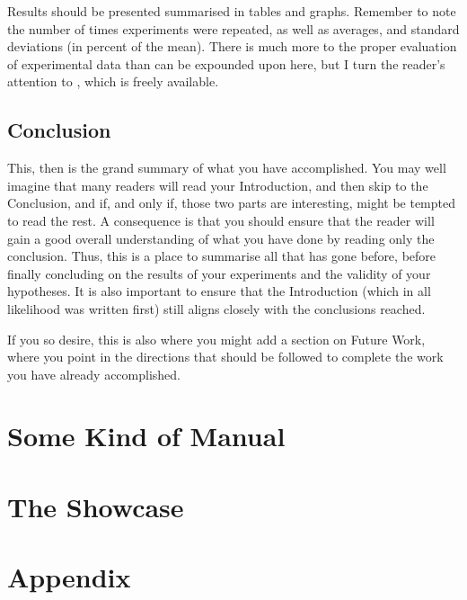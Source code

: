 \documentclass[ twoside,openright,titlepage,numbers=noenddot,headinclude,%
                footinclude=true,cleardoublepage=empty,abstractoff, %
                BCOR=5mm,paper=a4,fontsize=11pt,%
                ngerman,american,%
                ]{scrreprt}
\begin{document}
Results should be presented summarised in tables and graphs.  Remember
to note the number of times experiments were repeated, as well as
averages, and standard deviations (in percent of the mean).  There is
much more to the proper evaluation of experimental data than can be
expounded upon here, but I turn the reader's attention to
\citep{Downey2011:TSPASFP2011}, which is freely available.


\chapter{Conclusion}
\label{cha:conclusion}

This, then is the grand summary of what you have accomplished.  You
may well imagine that many readers will read your Introduction, and
then skip to the Conclusion, and if, and only if, those two parts are
interesting, might be tempted to read the rest. A consequence is that
you should ensure that the reader will gain a good overall
understanding of what you have done by reading only the conclusion.
Thus, this is a place to summarise all that has gone before, before
finally concluding on the results of your experiments and the validity
of your hypotheses. It is also important to ensure that the
Introduction (which in all likelihood was written first) still aligns
closely with the conclusions reached.

If you so desire, this is also where you might add a section on Future
Work, where you point in the directions that should be followed to
complete the work you have already accomplished.



\part{Some Kind of Manual}

\cleardoublepage

\part{The Showcase}





\appendix
\cleardoublepage
\part{Appendix}

\cleardoublepage
\cleardoublepage
\cleardoublepage
\end{document}
